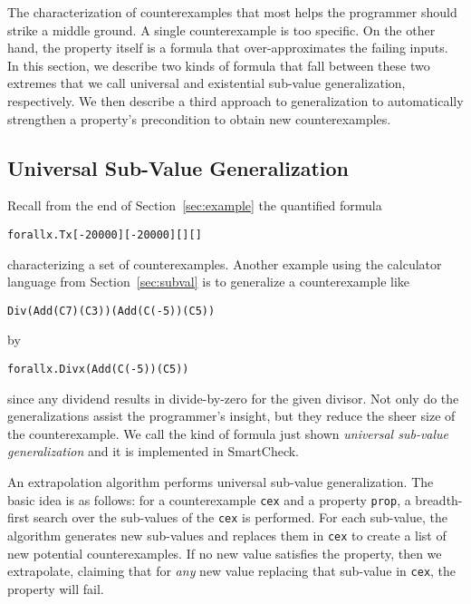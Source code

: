 \documentclass{sigplanconf}
\newenvironment{code}{\begin{alltt}}{\end{alltt}}
\newcommand{\ttp}[1]{\texttt{#1}}
\begin{document}
The characterization of counterexamples that most helps the programmer should
strike a middle ground.  A single counterexample is too specific.  On the other
hand, the property itself is a formula that over-approximates the failing
inputs.  In this section, we describe two kinds of formula that fall between
these two extremes that we call universal and existential sub-value
generalization, respectively.  We then describe a third approach to
generalization to automatically strengthen a property's precondition to obtain
new counterexamples.

\subsection{Universal Sub-Value Generalization}\label{sec:universal}
Recall from the end of Section~\ref{sec:example} the quantified formula
%
\begin{code}
forall x . T x [-20000] [-20000] [] []
\end{code}
%
\noindent
characterizing a set of counterexamples.  Another example using the calculator
language from Section~\ref{sec:subval} is to generalize a counterexample like
%
\begin{code}
Div (Add (C 7) (C 3)) (Add (C (-5)) (C 5))
\end{code}
%
\noindent
by
%
\begin{code}
forall x . Div x (Add (C (-5)) (C 5))
\end{code}
%
\noindent
since any dividend results in divide-by-zero for the given divisor.  Not only do
the generalizations assist the programmer's insight, but they reduce the sheer
size of the counterexample.  We call the kind of formula just shown
\emph{universal sub-value generalization} and it is implemented in SmartCheck.

An extrapolation algorithm performs universal sub-value generalization.  The
basic idea is as follows: for a counterexample \ttp{cex} and a property
\ttp{prop}, a breadth-first search over the sub-values of the \ttp{cex} is
performed.  For each sub-value, the algorithm generates new sub-values and
replaces them in \ttp{cex} to create a list of new potential counterexamples.
If no new value satisfies the property, then we extrapolate, claiming that for
\emph{any} new value replacing that sub-value in \ttp{cex}, the property will
fail.
\end{document}
